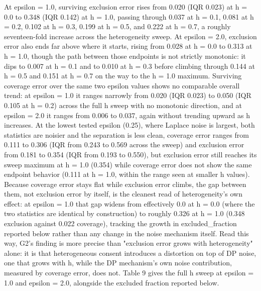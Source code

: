 At epsilon = 1.0, surviving exclusion error rises from 0.020 (IQR 0.023) at h = 0.0 to 0.348 (IQR 0.142) at h = 1.0, passing through 0.037 at h = 0.1, 0.081 at h = 0.2, 0.102 at h = 0.3, 0.199 at h = 0.5, and 0.222 at h = 0.7, a roughly seventeen-fold increase across the heterogeneity sweep. At epsilon = 2.0, exclusion error also ends far above where it starts, rising from 0.028 at h = 0.0 to 0.313 at h = 1.0, though the path between those endpoints is not strictly monotonic: it dips to 0.007 at h = 0.1 and to 0.010 at h = 0.3 before climbing through 0.144 at h = 0.5 and 0.151 at h = 0.7 on the way to the h = 1.0 maximum. Surviving coverage error over the same two epsilon values shows no comparable overall trend: at epsilon = 1.0 it ranges narrowly from 0.020 (IQR 0.023) to 0.050 (IQR 0.105 at h = 0.2) across the full h sweep with no monotonic direction, and at epsilon = 2.0 it ranges from 0.006 to 0.037, again without trending upward as h increases. At the lowest tested epsilon (0.25), where Laplace noise is largest, both statistics are noisier and the separation is less clean, coverage error ranges from 0.111 to 0.306 (IQR from 0.243 to 0.569 across the sweep) and exclusion error from 0.181 to 0.354 (IQR from 0.193 to 0.550), but exclusion error still reaches its sweep maximum at h = 1.0 (0.354) while coverage error does not show the same endpoint behavior (0.111 at h = 1.0, within the range seen at smaller h values). Because coverage error stays flat while exclusion error climbs, the gap between them, not exclusion error by itself, is the cleanest read of heterogeneity's own effect: at epsilon = 1.0 that gap widens from effectively 0.0 at h = 0.0 (where the two statistics are identical by construction) to roughly 0.326 at h = 1.0 (0.348 exclusion against 0.022 coverage), tracking the growth in excluded\_fraction reported below rather than any change in the noise mechanism itself. Read this way, G2's finding is more precise than "exclusion error grows with heterogeneity" alone: it is that heterogeneous consent introduces a distortion on top of DP noise, one that grows with h, while the DP mechanism's own noise contribution, measured by coverage error, does not. Table 9 gives the full h sweep at epsilon = 1.0 and epsilon = 2.0, alongside the excluded fraction reported below.

